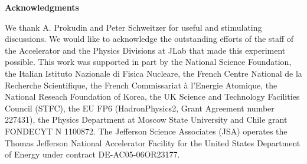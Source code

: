 \documentclass[aps,prl,twocolumn,showpacs,superscriptaddress,groupedaddress]{revtex4-1}  %
\begin{document}
\begin{center}
\textbf{Acknowledgments} \par
\end{center}
We thank A. Prokudin and Peter Schweitzer for useful and stimulating discussions.
We would like to acknowledge the outstanding efforts of the staff of the 
Accelerator and the Physics Divisions at JLab that made this experiment possible.
This work was supported in part by 
the National Science Foundation, 
the Italian Istituto Nazionale di Fisica Nucleare, 
the French Centre National de la Recherche Scientifique,
the French Commissariat \`{a} l'Energie Atomique, 
the National Reseach Foundation of Korea,
the UK Science and Technology Facilities Council (STFC),
the EU FP6 (HadronPhysics2, Grant Agreement number 227431),
the Physics Department at Moscow State University
and Chile grant FONDECYT N 1100872.
The Jefferson Science Associates (JSA) operates the Thomas Jefferson National Accelerator Facility for the United States Department of Energy under contract DE-AC05-06OR23177.



\end{document}
